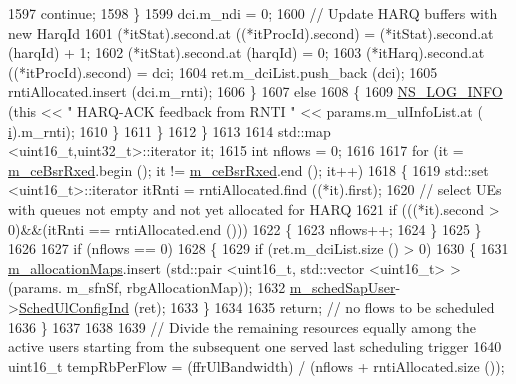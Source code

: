 \begin{DoxyCode}
1597                   \textcolor{keywordflow}{continue};
1598                 \}
1599               dci.m\_ndi = 0;
1600               \textcolor{comment}{// Update HARQ buffers with new HarqId}
1601               (*itStat).second.at ((*itProcId).second) = (*itStat).second.at (harqId) + 1;
1602               (*itStat).second.at (harqId) = 0;
1603               (*itHarq).second.at ((*itProcId).second) = dci;
1604               ret.m\_dciList.push\_back (dci);
1605               rntiAllocated.insert (dci.m\_rnti);
1606             \}
1607             \textcolor{keywordflow}{else}
1608             \{
1609               \hyperlink{group__logging_gafbd73ee2cf9f26b319f49086d8e860fb}{NS\_LOG\_INFO} (\textcolor{keyword}{this} << \textcolor{stringliteral}{" HARQ-ACK feedback from RNTI "} << params.m\_ulInfoList.at (
      \hyperlink{bernuolliDistribution_8m_a6f6ccfcf58b31cb6412107d9d5281426}{i}).m\_rnti);
1610             \}
1611         \}
1612     \}
1613 
1614   std::map <uint16\_t,uint32\_t>::iterator it;
1615   \textcolor{keywordtype}{int} nflows = 0;
1616 
1617   \textcolor{keywordflow}{for} (it = \hyperlink{classns3_1_1TdTbfqFfMacScheduler_ab399ba0c15f9cd1688fb044cf915deb7}{m\_ceBsrRxed}.begin (); it != \hyperlink{classns3_1_1TdTbfqFfMacScheduler_ab399ba0c15f9cd1688fb044cf915deb7}{m\_ceBsrRxed}.end (); it++)
1618     \{
1619       std::set <uint16\_t>::iterator itRnti = rntiAllocated.find ((*it).first);
1620       \textcolor{comment}{// select UEs with queues not empty and not yet allocated for HARQ}
1621       \textcolor{keywordflow}{if} (((*it).second > 0)&&(itRnti == rntiAllocated.end ()))
1622         \{
1623           nflows++;
1624         \}
1625     \}
1626 
1627   \textcolor{keywordflow}{if} (nflows == 0)
1628     \{
1629       \textcolor{keywordflow}{if} (ret.m\_dciList.size () > 0)
1630         \{
1631           \hyperlink{classns3_1_1TdTbfqFfMacScheduler_a0801127489d3eda5a462660c4af4c8bd}{m\_allocationMaps}.insert (std::pair <uint16\_t, std::vector <uint16\_t> > (params.
      m\_sfnSf, rbgAllocationMap));
1632           \hyperlink{classns3_1_1TdTbfqFfMacScheduler_a8f5689c5d8af1b40e97dacfce14f605a}{m\_schedSapUser}->\hyperlink{classns3_1_1FfMacSchedSapUser_a1b89636256701a84d990db7db8aea874}{SchedUlConfigInd} (ret);
1633         \}
1634         
1635       \textcolor{keywordflow}{return};  \textcolor{comment}{// no flows to be scheduled}
1636     \}
1637 
1638 
1639   \textcolor{comment}{// Divide the remaining resources equally among the active users starting from the subsequent one served
       last scheduling trigger}
1640   uint16\_t tempRbPerFlow = (ffrUlBandwidth) / (nflows + rntiAllocated.size ());

\end{DoxyCode}
